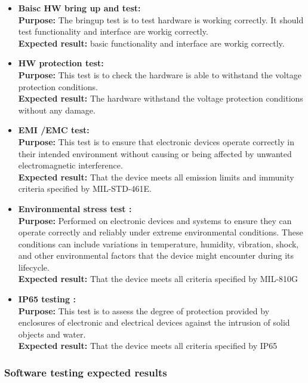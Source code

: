 \documentclass[a4paper,12pt]{article}
\begin{document}
	\begin{itemize}
		\item \textbf{Baisc HW bring up and test: }\\
		\textbf{Purpose:} The bringup test is to test hardware is working correctly. It should test functionality and interface are workig correctly.\\
		\textbf {Expected result:} basic functionality and interface are workig correctly.
		\item \textbf{HW protection test:}\\
		\textbf {Purpose:} This test is to check the hardware is able to withstand the voltage protection conditions.\\
		\textbf {Expected result:} The hardware withstand the voltage protection conditions without any damage. 
		\item \textbf{EMI /EMC test: }\\
		\textbf {Purpose:} This test is to ensure that electronic devices operate correctly in their intended environment without causing or being affected by unwanted electromagnetic interference.\\
		\textbf {Expected result:}  That the device meets all emission limits and immunity criteria specified by MIL-STD-461E. 
		\item \textbf{Environmental stress test : } \\
		\textbf{Purpose:} 	Performed on electronic devices and systems to ensure they can operate correctly and reliably under extreme environmental conditions. These conditions can include variations in temperature, humidity, vibration, shock, and other environmental factors that the device might encounter during its lifecycle.\\
		\textbf {Expected result:} That the device meets all criteria specified by MIL-810G
		\item \textbf{IP65 testing : }\\
		\textbf {Purpose:} This test is to assess the degree of protection provided by enclosures of electronic and electrical devices against the intrusion of solid objects and water.\\
		\textbf {Expected result:}  That the device meets all criteria specified by IP65
		
	\end{itemize}
	
	
		
	\subsubsection{Software testing expected results}
	
\end{document}
